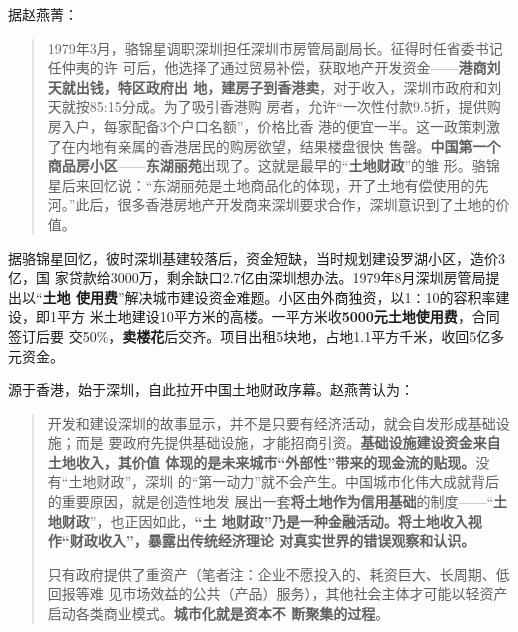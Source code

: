 据赵燕菁\cite{dajueqi}：
\begin{quotation}
  1979年3月，骆锦星调职深圳担任深圳市房管局副局长。征得时任省委书记任仲夷的许
  可后，他选择了通过贸易补偿，获取地产开发资金——\textbf{港商刘天就出钱，特区政府出
  地，建房子到香港卖}，对于收入，深圳市政府和刘天就按85:15分成。为了吸引香港购
  房者，允许“一次性付款9.5折，提供购房入户，每家配备3个户口名额”，价格比香
  港的便宜一半。这一政策刺激了在内地有亲属的香港居民的购房欲望，结果楼盘很快
  售罄。\textbf{中国第一个商品房小区}——\textbf{东湖丽苑}出现了。这就是最早的“\textbf{土地财政}”的雏
  形。骆锦星后来回忆说：“东湖丽苑是土地商品化的体现，开了土地有偿使用的先
  河。”此后，很多香港房地产开发商来深圳要求合作，深圳意识到了土地的价值。
\end{quotation}

据骆锦星回忆，彼时深圳基建较落后，资金短缺，当时规划建设罗湖小区，造价3亿，国
家贷款给3000万，剩余缺口2.7亿由深圳想办法。1979年8月深圳房管局提出以“\textbf{土地
  使用费}”解决城市建设资金难题。小区由外商独资，以1∶10的容积率建设，即1平方
米土地建设10平方米的高楼。一平方米收\textbf{5000元土地使用费}，合同签订后要
交50\%，\textbf{卖楼花}后交齐。项目出租5块地，占地1.1平方千米，收回5亿多元资金。

源于香港，始于深圳，自此拉开中国土地财政序幕。赵燕菁认为：
\begin{quotation}
  开发和建设深圳的故事显示，并不是只要有经济活动，就会自发形成基础设施；而是
  要政府先提供基础设施，才能招商引资。\textbf{基础设施建设资金来自土地收入，其价值
    体现的是未来城市“外部性”带来的现金流的贴现。}没有“土地财政”，深圳
  的“第一动力”就不会产生。中国城市化伟大成就背后的重要原因，就是创造性地发
  展出一套\textbf{将土地作为信用基础}的制度——“\textbf{土地财政}”，也正因如此，\textbf{“土
    地财政”乃是一种金融活动。将土地收入视作“财政收入”，暴露出传统经济理论
    对真实世界的错误观察和认识。}

  只有政府提供了重资产（笔者注：企业不愿投入的、耗资巨大、长周期、低回报等难
  见市场效益的公共（产品）服务），其他社会主体才可能以轻资产启动各类商业模式。\textbf{城市化就是资本不
    断聚集的过程}。
\end{quotation}

